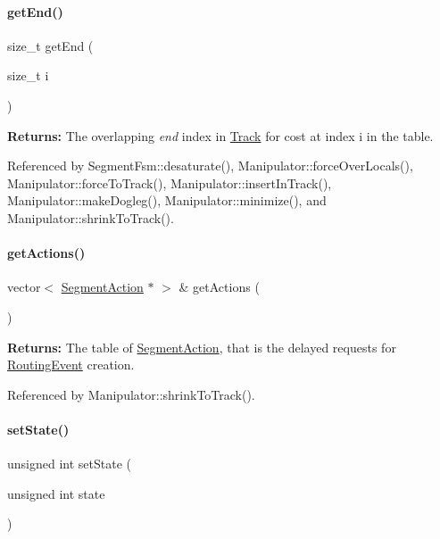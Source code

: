 \paragraph{\texorpdfstring{get\+End()}{getEnd()}}
{\footnotesize\ttfamily size\+\_\+t get\+End (\begin{DoxyParamCaption}\item[{size\+\_\+t}]{i }\end{DoxyParamCaption})\hspace{0.3cm}{\ttfamily [inline]}}

{\bfseries Returns\+:} The overlapping {\itshape end} index in \mbox{\hyperlink{classKite_1_1Track}{Track}} for cost at index {\ttfamily i} in the table. 

Referenced by Segment\+Fsm\+::desaturate(), Manipulator\+::force\+Over\+Locals(), Manipulator\+::force\+To\+Track(), Manipulator\+::insert\+In\+Track(), Manipulator\+::make\+Dogleg(), Manipulator\+::minimize(), and Manipulator\+::shrink\+To\+Track().

\mbox{\label{classKite_1_1SegmentFsm_ab3b06bb353ee9333be6b937bffc8fd84}} 
\paragraph{\texorpdfstring{get\+Actions()}{getActions()}}
{\footnotesize\ttfamily vector$<$ \mbox{\hyperlink{classKite_1_1SegmentAction}{Segment\+Action}} $\ast$ $>$ \& get\+Actions (\begin{DoxyParamCaption}{ }\end{DoxyParamCaption})\hspace{0.3cm}{\ttfamily [inline]}}

{\bfseries Returns\+:} The table of \mbox{\hyperlink{classKite_1_1SegmentAction}{Segment\+Action}}, that is the delayed requests for \mbox{\hyperlink{classKite_1_1RoutingEvent}{Routing\+Event}} creation. 

Referenced by Manipulator\+::shrink\+To\+Track().

\mbox{\label{classKite_1_1SegmentFsm_adf5147448951f8dc8b4088a1032e97b2}} 
\paragraph{\texorpdfstring{set\+State()}{setState()}}
{\footnotesize\ttfamily unsigned int set\+State (\begin{DoxyParamCaption}\item[{unsigned int}]{state }\end{DoxyParamCaption})\hspace{0.3cm}{\ttfamily [inline]}}

